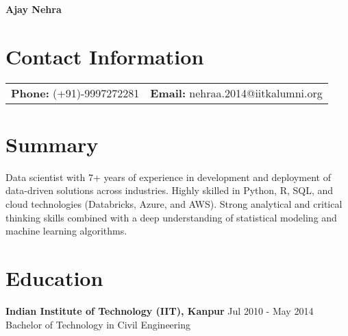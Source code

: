 \documentclass[a4paper,12pt]{article}
\begin{document}
\begin{center}
    \textbf{\Huge Ajay Nehra}
\end{center}

\section*{Contact Information}
\begin{tabular}{@{}ll}
    \textbf{Phone:} (+91)-9997272281 & \textbf{Email:} nehraa.2014@iitkalumni.org \\
\end{tabular}

\section*{Summary}
Data scientist with 7+ years of experience in development and deployment of data-driven solutions across industries. Highly skilled in Python, R, SQL, and cloud technologies (Databricks, Azure, and AWS). Strong analytical and critical thinking skills combined with a deep understanding of statistical modeling and machine learning algorithms.


\section*{Education}
\textbf{Indian Institute of Technology (IIT), Kanpur} \hfill \textnormal{Jul 2010 - May 2014} \\
Bachelor of Technology in Civil Engineering

\end{document}
